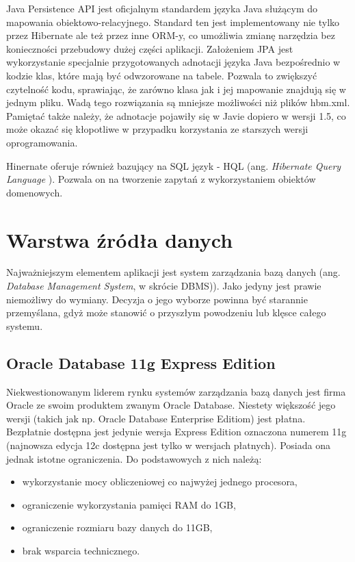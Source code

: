 Java Persistence API jest oficjalnym standardem języka Java służącym do mapowania obiektowo-relacyjnego. Standard ten jest implementowany nie tylko przez Hibernate ale też przez inne ORM-y, co umożliwia zmianę narzędzia bez konieczności przebudowy dużej części aplikacji. Założeniem JPA jest wykorzystanie specjalnie przygotowanych adnotacji języka Java bezpośrednio w kodzie klas, które mają być odwzorowane na tabele. Pozwala to zwiększyć czytelność kodu, sprawiając, że zarówno klasa jak i jej mapowanie znajdują się w jednym pliku. Wadą tego rozwiązania są mniejsze możliwości niż plików hbm.xml. Pamiętać także należy, że adnotacje pojawiły się w Javie dopiero w wersji 1.5, co może okazać się kłopotliwe w przypadku korzystania ze starszych wersji oprogramowania.

Hinernate oferuje również bazujący na SQL język - HQL (ang. \textit{Hibernate Query Language }). Pozwala on na tworzenie zapytań z wykorzystaniem obiektów domenowych.

\section[Warstwa źródła danych][Warstwa źródła danych]{Warstwa źródła danych}
Najważniejszym elementem aplikacji jest system zarządzania bazą danych (ang. \textit{Database Management System}, w skrócie DBMS)). Jako jedyny jest prawie niemożliwy do wymiany. Decyzja o jego wyborze powinna być starannie przemyślana, gdyż może stanowić o przyszłym powodzeniu lub klęsce całego systemu.

\subsection[Oracle Database 11g Express Edition][Oracle Database 11g Express Edition]{Oracle Database 11g Express Edition} 
Niekwestionowanym liderem rynku systemów zarządzania bazą danych jest firma Oracle ze swoim produktem zwanym Oracle Database. Niestety większość jego wersji (takich jak np. Oracle Database Enterprise Editiom) jest płatna. Bezpłatnie dostępna jest jedynie wersja Express Edition oznaczona numerem 11g (najnowsza edycja 12c dostępna jest tylko w wersjach płatnych).  Posiada ona jednak istotne ograniczenia. Do podstawowych z nich należą:
\begin{itemize}
	\item wykorzystanie mocy obliczeniowej co najwyżej jednego procesora,
	\item ograniczenie wykorzystania pamięci RAM do 1GB,
	\item ograniczenie rozmiaru bazy danych do 11GB,
	\item brak wsparcia technicznego.
\end{itemize}

